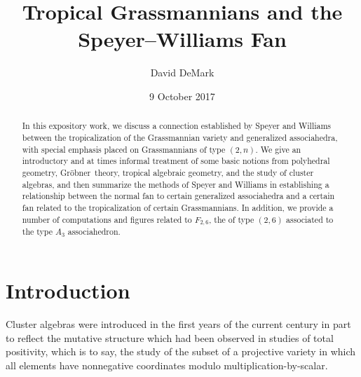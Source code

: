 \documentclass[12pt,letter]{article}
\title{Tropical Grassmannians and the Speyer--Williams Fan}
\date{9 October 2017}
\author{David DeMark}
\newcommand{\gro}{Gr\"obner~}
\begin{document}
\maketitle
\setcounter{section}{-1}
\begin{abstract}
In this expository work, we discuss a connection established by Speyer and Williams between the tropicalization of the Grassmannian variety and generalized associahedra, with special emphasis placed on Grassmannians of type $(2,n)$. We give an introductory and at times informal treatment of some basic notions from polyhedral geometry, \gro theory, tropical algebraic geometry, and the study of cluster algebras, and then summarize the methods of Speyer and Williams in establishing a relationship between the normal fan to certain generalized associahedra and a certain fan related to the tropicalization of certain Grassmannians. In addition, we provide a number of computations and figures related to $F_{2,6}$, the  of type $(2,6)$ associated to the type $A_3$ associahedron. \end{abstract}\section{Introduction} Cluster algebras were introduced in the first years of the current century in part to reflect the mutative structure which had been observed in studies of total positivity, which is to say, the study of the subset of a projective variety in which all elements have nonnegative coordinates modulo multiplication-by-scalar. 
\end{document}
